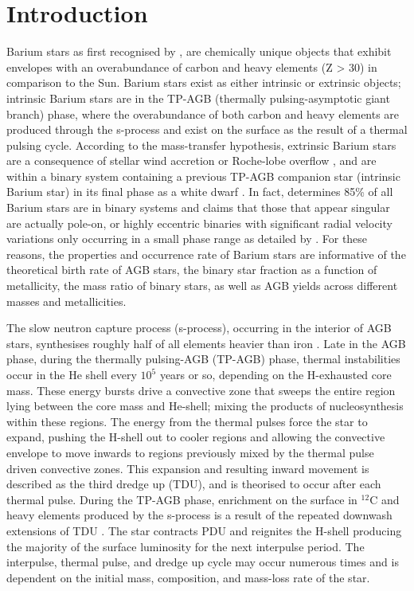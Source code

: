 \documentclass[a4paper,fleqn,usenatbib]{mnras}
\begin{document}
\section{Introduction} \label{sec:intro}

Barium stars as first recognised by \citet{Bidelman1951}, are chemically unique objects that exhibit envelopes with an overabundance of carbon and heavy elements (Z > 30) in comparison to the Sun. Barium stars exist as either intrinsic or extrinsic objects; intrinsic Barium stars are in the TP-AGB (thermally pulsing-asymptotic giant branch) phase, where the overabundance of both carbon and heavy elements are produced through the s-process and exist on the surface as the result of a thermal pulsing cycle. According to the mass-transfer hypothesis, extrinsic Barium stars are a consequence of stellar wind accretion \citep{boffin1988,jorissen1992} or Roche-lobe overflow \citep{webbink1986}, and are within a binary system containing a previous TP-AGB companion star (intrinsic Barium star) in its final phase as a white dwarf \citep{bohm1980,bohm1984}. In fact, \citet{mcclure1983} determines 85\% of all Barium stars are in binary systems and claims that those that appear singular are actually pole-on, or highly eccentric binaries with significant radial velocity variations only occurring in a small phase range as detailed by \citet{pourbaix2004}. For these reasons, the properties and occurrence rate of Barium stars are informative of the theoretical birth rate of AGB stars, the binary star fraction as a function of metallicity, the mass ratio of binary stars, as well as AGB yields across different masses and metallicities. 

The slow neutron capture process (s-process), occurring in the interior of AGB stars, synthesises roughly half of all elements heavier than iron \citep[e.g.][]{busso1999,travaglio2001,herwig2005,romano2010,kobayashi2011,prantzos2012,bisterzo2014,karakas12016}. Late in the AGB phase, during the thermally pulsing-AGB (TP-AGB) phase, thermal instabilities occur in the He shell every $10^5$ years or so, depending on the H-exhausted core mass. These energy bursts drive a convective zone that sweeps the entire region lying between the core mass and He-shell; mixing the products of nucleosynthesis within these regions. The energy from the thermal pulses force the star to expand, pushing the H-shell out to cooler regions and allowing the convective envelope to move inwards to regions previously mixed by the thermal pulse driven convective zones. This expansion and resulting inward movement is described as the third dredge up (TDU), and is theorised to occur after each thermal pulse. During the TP-AGB phase, enrichment on the surface in $^{12}$C and heavy elements produced by the s-process is a result of the repeated downwash extensions of TDU \citep[e.g.][]{busso2001}. The star contracts PDU and reignites the H-shell producing the majority of the surface luminosity for the next interpulse period. The interpulse, thermal pulse, and dredge up cycle may occur numerous times and is dependent on the initial mass, composition, and mass-loss rate of the star.
\end{document}
